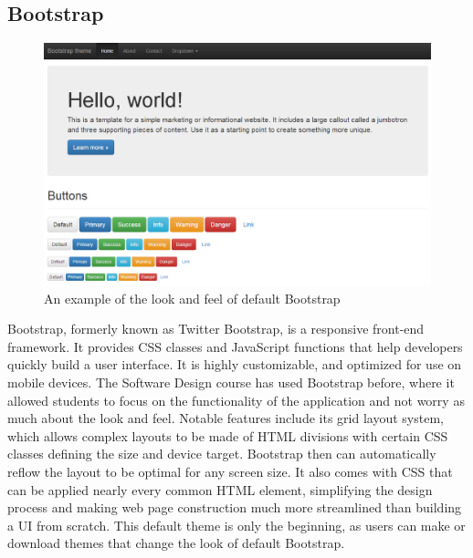 \documentclass[12pt]{article}
\begin{document}
\subsection{Bootstrap}\label{sec:bootstrap}
\begin{figure}[h!]
\includegraphics[width=\linewidth]{img/bootstrap.png}
\caption{An example of the look and feel of default Bootstrap}
\end{figure}
Bootstrap\cite{Bootstrap}, formerly known as Twitter Bootstrap, is a responsive front-end framework. It provides CSS classes and JavaScript functions that help developers quickly build a user interface. It is highly customizable, and optimized for use on mobile devices. The Software Design course has used Bootstrap before, where it allowed students to focus on the functionality of the application and not worry as much about the look and feel. Notable features include its grid layout system, which allows complex layouts to be made of HTML divisions with certain CSS classes defining the size and device target. Bootstrap then can automatically reflow the layout to be optimal for any screen size. It also comes with CSS that can be applied nearly every common HTML element, simplifying the design process and making web page construction much more streamlined than building a UI from scratch. This default theme is only the beginning, as users can make or download themes that change the look of default Bootstrap.
\end{document}
